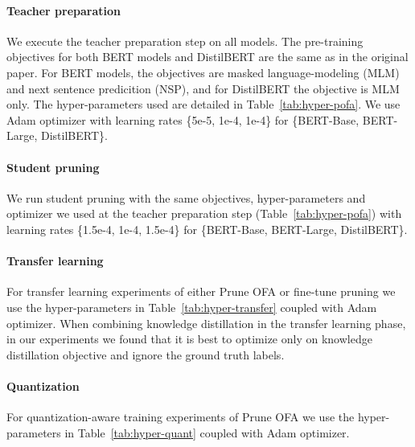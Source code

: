 \documentclass{article}
\begin{document}
\paragraph{Teacher preparation}
We execute the teacher preparation step on all models.
The pre-training objectives for both BERT models and DistilBERT are the same as in the original paper.
For BERT models, the objectives are masked language-modeling (MLM) and next sentence predicition (NSP), and for DistilBERT the objective is MLM only.
The hyper-parameters used are detailed in Table~\ref{tab:hyper-pofa}.
We use Adam optimizer \citep{kingma2015adam} with learning rates \{5e-5, 1e-4, 1e-4\} for \{BERT-Base, BERT-Large, DistilBERT\}.

\paragraph{Student pruning}
We run student pruning with the same objectives, hyper-parameters and optimizer we used at the teacher preparation step (Table~\ref{tab:hyper-pofa}) with learning rates \{1.5e-4, 1e-4, 1.5e-4\} for \{BERT-Base, BERT-Large, DistilBERT\}.

\paragraph{Transfer learning}
For transfer learning experiments of either Prune OFA or fine-tune pruning we use the hyper-parameters in Table~\ref{tab:hyper-transfer} coupled with Adam optimizer.
When combining knowledge distillation in the transfer learning phase, in our experiments we found that it is best to optimize only on knowledge distillation objective and ignore the ground truth labels.

\paragraph{Quantization}
For quantization-aware training experiments of Prune OFA  we use the hyper-parameters in Table~\ref{tab:hyper-quant} coupled with Adam optimizer.
\end{document}
